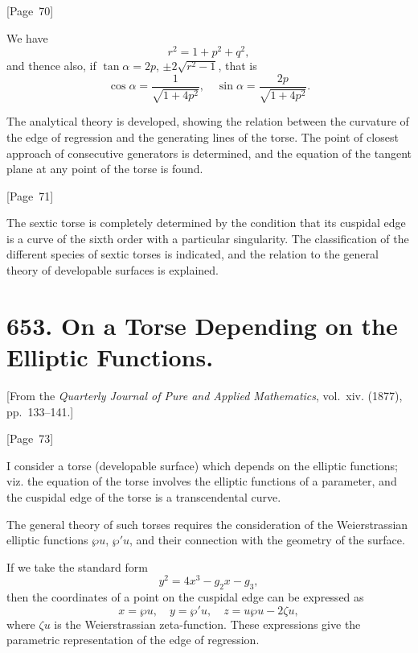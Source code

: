 \documentclass[11pt,a4paper]{article}
\theoremstyle{plain}
\theoremstyle{definition}
\theoremstyle{remark}
\begin{document}
\begin{center}
[Page~70]
\end{center}

We have
\[
r^2 = 1 + p^2 + q^2,
\]
and thence also, if $\tan\alpha = 2p$, $\pm 2\sqrt{r^2-1}$, that is
\[
\cos\alpha = \frac{1}{\sqrt{1+4p^2}}, \quad
\sin\alpha = \frac{2p}{\sqrt{1+4p^2}}.
\]

The analytical theory is developed, showing the relation between the
curvature of the edge of regression and the generating lines of the
torse. The point of closest approach of consecutive generators is
determined, and the equation of the tangent plane at any point of the
torse is found.

\begin{center}
[Page~71]
\end{center}

The sextic torse is completely determined by the condition that its
cuspidal edge is a curve of the sixth order with a particular
singularity. The classification of the different species of sextic
torses is indicated, and the relation to the general theory of
developable surfaces is explained.


\newpage
\section*{653. On a Torse Depending on the Elliptic Functions.}

[From the \textit{Quarterly Journal of Pure and Applied Mathematics},
vol.~xiv. (1877), pp.~133--141.]

\begin{center}
[Page~73]
\end{center}

I consider a torse (developable surface) which depends on the elliptic
functions; viz. the equation of the torse involves the elliptic
functions of a parameter, and the cuspidal edge of the torse is a
transcendental curve.

The general theory of such torses requires the consideration of the
Weierstrassian elliptic functions $\wp u$, $\wp' u$, and their
connection with the geometry of the surface.

If we take the standard form
\[
y^2 = 4x^3 - g_2x - g_3,
\]
then the coordinates of a point on the cuspidal edge can be expressed as
\[
x = \wp u, \quad y = \wp' u, \quad z = u \wp u - 2\zeta u,
\]
where $\zeta u$ is the Weierstrassian zeta-function. These expressions
give the parametric representation of the edge of regression.
\end{document}
